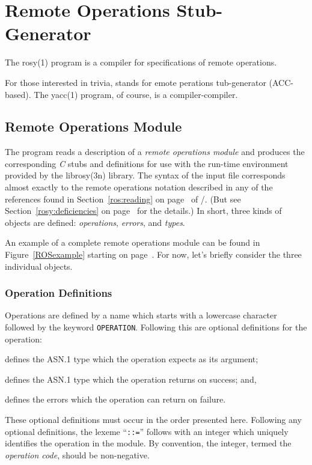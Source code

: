 
\chapter	{Remote Operations Stub-Generator}\label{rosy}
The \man rosy(1) program is a compiler for specifications of remote operations.

For those interested in trivia,
 stands for
emote
perations
tub-generator
(ACC-based).
The \man yacc(1) program,
of course,
is a compiler-compiler.

\section	{Remote Operations Module}
The  program reads a description of a {\em remote operations
module\/}
and produces the corresponding {\em C\/} stubs and definitions for use with
the run-time environment provided by the \man librosy(3n) library.
The syntax of the input file corresponds almost exactly to the remote
operations notation described in any of the references found in
Section~\ref{ros:reading} on page~\pageref{ros:reading} of \volone/.
(But see Section~\ref{rosy:deficiencies} on page~\pageref{rosy:deficiencies}
for the details.)
In short, three kinds of objects are defined:
{\em operations}, {\em errors}, and {\em types}.

An example of a complete remote operations module can be found in
Figure~\ref{ROSexample} starting on page~\pageref{ROSexample}.
For now,
let's briefly consider the three individual objects.

\subsection	{Operation Definitions}
Operations are defined by a name which starts with a lowercase character
followed by the keyword \verb"OPERATION".
Following this are optional definitions for the operation:
\begin{describe}
\item[\verb"ARGUMENT":]	defines the ASN.1 type which the operation expects
			as its argument;

\item[\verb"RESULTS":]	defines the ASN.1 type which the operation returns
			on success;
			and,

\item[\verb"ERRORS":]	defines the errors which the operation can return on
			failure.
\end{describe}
These optional definitions must occur in the order presented here.
Following any optional definitions,
the lexeme ``\verb"::="'' follows with an integer which uniquely identifies the
operation in the module.
By convention, the integer,
termed the {\em operation code},
should be non-negative.

